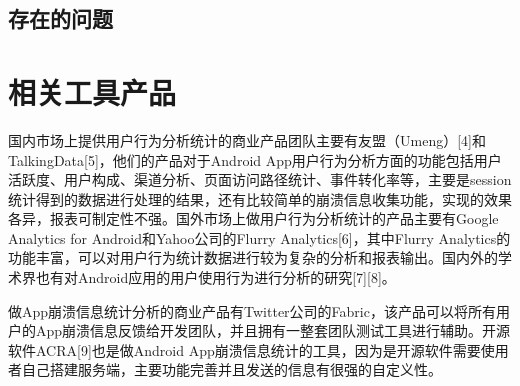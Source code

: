
\subsection{存在的问题}


\section{相关工具产品}

国内市场上提供用户行为分析统计的商业产品团队主要有友盟（Umeng）[4]和TalkingData[5]，他们的产品对于Android App用户行为分析方面的功能包括用户活跃度、用户构成、渠道分析、页面访问路径统计、事件转化率等，主要是session统计得到的数据进行处理的结果，还有比较简单的崩溃信息收集功能，实现的效果各异，报表可制定性不强。国外市场上做用户行为分析统计的产品主要有Google Analytics for Android和Yahoo公司的Flurry Analytics[6]，其中Flurry Analytics的功能丰富，可以对用户行为统计数据进行较为复杂的分析和报表输出。国内外的学术界也有对Android应用的用户使用行为进行分析的研究[7][8]。

做App崩溃信息统计分析的商业产品有Twitter公司的Fabric，该产品可以将所有用户的App崩溃信息反馈给开发团队，并且拥有一整套团队测试工具进行辅助。开源软件ACRA[9]也是做Android App崩溃信息统计的工具，因为是开源软件需要使用者自己搭建服务端，主要功能完善并且发送的信息有很强的自定义性。

